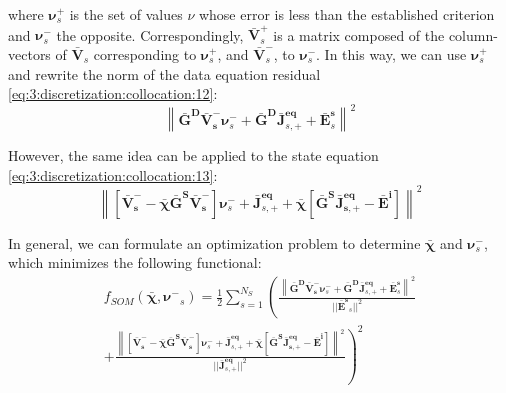 			\noindent where $\boldsymbol{\nu}^+_s$ is the set of values $\nu$ whose error is less than the established criterion and $\boldsymbol{\nu}^-_s$ the opposite. Correspondingly, $\mathbf{\bar{V}}^+_s$ is a matrix composed of the column-vectors of $\mathbf{\bar{V}}_s$ corresponding to $\boldsymbol{\nu}^+_s$, and $\mathbf{\bar{V}}^-_s$, to $\boldsymbol{\nu}^-_s$. In this way, we can use $\boldsymbol{\nu}^+_s$ and rewrite the norm of the data equation residual \eqref{eq:3:discretization:collocation:12}:
			\begin{equation}
				\left\| \mathbf{\bar{G}^D}\mathbf{\bar{V}^-_s}\boldsymbol{\nu}^-_s + \mathbf{\bar{G}^D}\mathbf{\bar{J}}^{\mathbf{eq}}_{s,+} + \mathbf{\bar{E}}^{\mathbf{s}}_s\right\|^2 \label{eq:3:deterministic:som:data}
			\end{equation}
		
			However, the same idea can be applied to the state equation \eqref{eq:3:discretization:collocation:13}:
			\begin{equation}
				\left\| \left[\mathbf{\bar{V}^-_s}-\boldsymbol{\bar{\chi}}\mathbf{\bar{G}^S}\mathbf{\bar{V}^-_s} \right]\boldsymbol{\nu}^-_s + \mathbf{\bar{J}}^{\mathbf{eq}}_{s,+} + \boldsymbol{\bar{\chi}}\left[\mathbf{\bar{G}^S\mathbf{\bar{J}}^\mathbf{eq}_{s,+}-\mathbf{\bar{E}^i}}\right] \right\|^2 \label{eq:3:deterministic:som:space}
			\end{equation}
		
			In general, we can formulate an optimization problem to determine $\boldsymbol{\bar{\chi}}$ and $\boldsymbol{\nu}^-_s$, which minimizes the following functional:
			\begin{multline}
				f_{SOM}(\boldsymbol{\bar{\chi}}, \boldsymbol{\nu^{-}}_s) = \frac{1}{2} \sum\limits_{s=1}^{N_S} \left(\frac{	\left\|\mathbf{\bar{G}^D}\mathbf{\bar{V}^-_s}\boldsymbol{\nu}^-_s + \mathbf{\bar{G}^D}\mathbf{\bar{J}}^{\mathbf{eq}}_{s,+} + \mathbf{\bar{E}}^{\mathbf{s}}_s\right\|^2}{||\mathbf{\bar{E}^s}_s||^2} \right. \\ \left. + \frac{\left\| \left[\mathbf{\bar{V}^{-}_s}-\boldsymbol{\bar{\chi}}\mathbf{\bar{G}^S}\mathbf{\bar{V}^-_s} \right]\boldsymbol{\nu}^-_s + \mathbf{\bar{J}}^{\mathbf{eq}}_{s,+} + \boldsymbol{\bar{\chi}}\left[\mathbf{\bar{G}^S\mathbf{\bar{J}}^\mathbf{eq}_{s,+}-\mathbf{\bar{E}^i}}\right] \right\|^2}{||\mathbf{\bar{J}}^\mathbf{eq}_{s,+}||^2}\right)^2 \label{eq:3:deterministic:som:functional}
			\end{multline}
		
